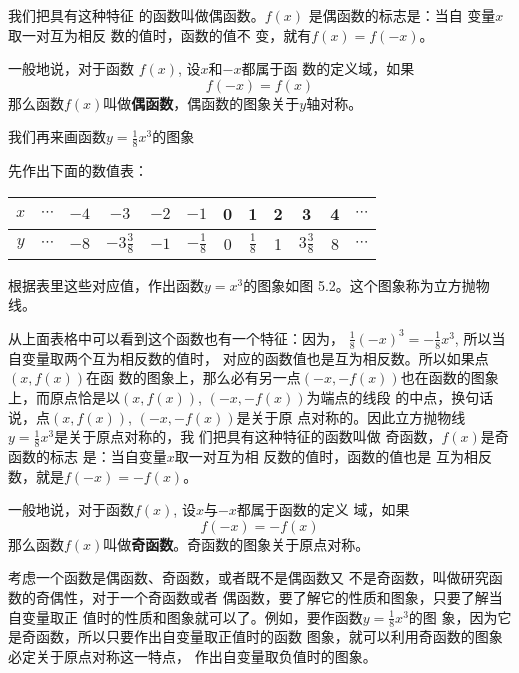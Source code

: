 我们把具有这种特征
的函数叫做偶函数。$f(x)$
是偶函数的标志是：当自
变量$x$取一对互为相反
数的值时，函数的值不
变，就有$f(x)=f(-x)$。

一般地说，对于函数
$f(x)$, 设$x$和$-x$都属于函
数的定义域，如果
\[f(-x)=f(x)\]
那么函数$f(x)$叫做\textbf{偶函数}，偶函数的图象关于$y$轴对称。

我们再来画函数$y=\frac{1}{8}x^3$的图象

先作出下面的数值表：
\begin{center}
\begin{tabular}{c|ccccccccccc}
    \hline
    $x$ &$\cdots$&$-4$&$-3$&$-2$&$-1$&0&1&2&3&4&$\cdots$\\
\hline
$y$ &$\cdots$&$-8$&$-3\frac{3}{8}$&$-1$&$-\frac{1}{8}$&0&$\frac{1}{8}$&1&$3\frac{3}{8}$&8&$\cdots$\\
\hline
\end{tabular}
\end{center}

根据表里这些对应值，作出函数$y=x^3$的图象如图
5.2。这个图象称为立方抛物线。
\begin{figure}[htp]
    \centering
{}
    \caption{}
\end{figure}

从上面表格中可以看到这个函数也有一个特征：因为，
$\frac{1}{8}(-x)^3=-\frac{1}{8}x^3$, 所以当自变量取两个互为相反数的值时，
对应的函数值也是互为相反数。所以如果点$(x,f(x))$在函
数的图象上，那么必有另一点$(-x,-f(x))$也在函数的图象
上，而原点恰是以$(x,f(x))$, $(-x,-f(x))$为端点的线段
的中点，换句话说，点$(x,f(x))$, $(-x,-f(x))$是关于原
点对称的。因此立方抛物线
$y=\frac{1}{8}x^3$是关于原点对称的，我
们把具有这种特征的函数叫做
奇函数，$f(x)$是奇函数的标志
是：当自变量$x$取一对互为相
反数的值时，函数的值也是
互为相反数，就是$f(-x)=-f(x)$。

一般地说，对于函数$f(x)$, 设$x$与$-x$都属于函数的定义
域，如果$$f(-x)=-f(x)$$ 那么函数$f(x)$叫做\textbf{奇函数}。奇函数的图象关于原点对称。

考虑一个函数是偶函数、奇函数，或者既不是偶函数又
不是奇函数，叫做研究函数的奇偶性，对于一个奇函数或者
偶函数，要了解它的性质和图象，只要了解当自变量取正
值时的性质和图象就可以了。例如，要作函数$y=\frac{1}{8}x^3$的图
象，因为它是奇函数，所以只要作出自变量取正值时的函数
图象，就可以利用奇函数的图象必定关于原点对称这一特点，
作出自变量取负值时的图象。
















